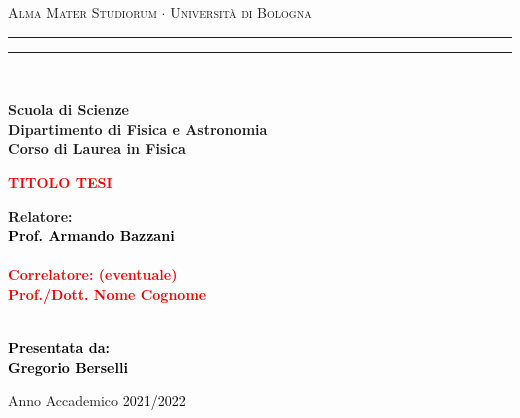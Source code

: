\documentclass[12pt,a4paper]{report}
\begin{document}
\begin{titlepage}
%
%
%
%
\begin{center}
{{\Large{\textsc{Alma Mater Studiorum $\cdot$ Universit\`a di Bologna}}}} 
\rule[0.1cm]{15.8cm}{0.1mm}
\rule[0.5cm]{15.8cm}{0.6mm}
\\\vspace{3mm}

{\small{\bf Scuola di Scienze \\ 
Dipartimento di Fisica e Astronomia\\
Corso di Laurea in Fisica}}

\end{center}

\vspace{23mm}

\begin{center}\textcolor{red}{
%
%
{\LARGE{\bf TITOLO TESI}}\\
}\end{center}

\vspace{50mm} \par \noindent

\begin{minipage}[t]{0.47\textwidth}
%
%
{\large{\bf Relatore: \vspace{2mm}\\\textcolor{black}{
Prof. Armando Bazzani}\\\\
%
%
%
\textcolor{red}{
\bf Correlatore: (eventuale)
\vspace{2mm}\\
Prof./Dott. Nome Cognome\\\\}}}
\end{minipage}
%
\hfill
%
\begin{minipage}[t]{0.47\textwidth}\raggedleft \textcolor{black}{
{\large{\bf Presentata da:
\vspace{2mm}\\
Gregorio Berselli}}}
\end{minipage}

\vspace{40mm}

\begin{center}
Anno Accademico \textcolor{black}{2021/2022}
\end{center}

\end{titlepage}
\end{document}
